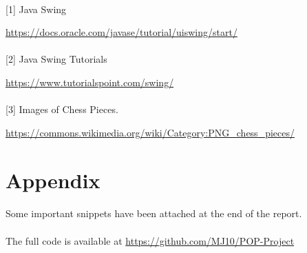 \paragraph{}
[1] Java Swing

\href{https://docs.oracle.com/javase/tutorial/uiswing/start/index.html}{https://docs.oracle.com/javase/tutorial/uiswing/start/}

\paragraph{}
[2] Java Swing Tutorials

\href{https://www.tutorialspoint.com/swing/}{https://www.tutorialspoint.com/swing/}

\paragraph{}
[3] Images of Chess Pieces.

\href{https://commons.wikimedia.org/wiki/Category:PNG_chess_pieces/Standard_transparent}{https://commons.wikimedia.org/wiki/Category:PNG\_chess\_pieces/}

\section{Appendix}

\paragraph{}
Some important snippets have been attached at the end of the report.

\paragraph{}
The full code is available at \href{https://github.com/MJ10/POP-Project}{https://github.com/MJ10/POP-Project}
